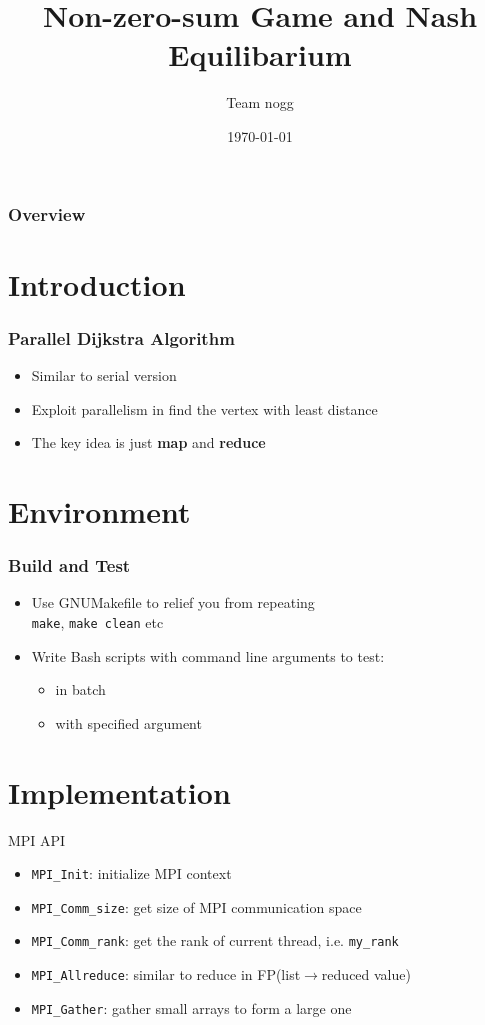 \documentclass{beamer}
\title[Short title]{Non-zero-sum Game and Nash Equilibarium}
\author{Team nogg}
\institute[SJTU]
{

}
\date{\today}
\begin{document}
\begin{frame}
\titlepage
\end{frame}

\begin{frame}
\frametitle{Overview}
\tableofcontents
\end{frame}

\section{Introduction} 

\begin{frame}
\frametitle{Parallel Dijkstra Algorithm}
\begin{itemize}
	\item Similar to serial version
	\item Exploit parallelism in find the vertex with least distance
	\item The key idea is just \textbf{map} and \textbf{reduce}
\end{itemize}
\end{frame}

\section{Environment}
\begin{frame}
\frametitle{Build and Test}
\begin{itemize}
\item Use GNUMakefile to relief you from repeating\\
		\qquad \texttt{make}, \texttt{make clean} etc
\item Write Bash scripts with command line arguments to test:
\begin{itemize}
	\item in batch
	\item with specified argument
\end{itemize}
 
\end{itemize}
\end{frame}

\section{Implementation}
\begin{frame}{MPI API}
	\begin{itemize}[<+->]
		\item \texttt{MPI\_Init}: initialize MPI context
		\item \texttt{MPI\_Comm\_size}: get size of MPI communication space
		\item \texttt{MPI\_Comm\_rank}: get the rank of current thread, i.e. \texttt{my\_rank}
		\item \texttt{MPI\_Allreduce}: similar to reduce in FP(list$\rightarrow$reduced value)
		\item \texttt{MPI\_Gather}: gather small arrays to form a large one
	\end{itemize}
\end{frame}
\end{document}
